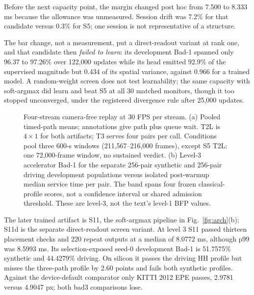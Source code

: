 \documentclass[sigconf,review,anonymous]{acmart}
\newlength{\MMSysPanelWidth}
\newlength{\MMSysPanelMaxWidth}
\newcommand{\MMSysRenderPanel}[1]{%
  \ifdim\MMSysPanelMaxWidth>\MMSysPanelWidth
    \resizebox{\MMSysPanelWidth}{!}{%
      \makebox[\MMSysPanelMaxWidth][c]{\usebox{#1}}}%
  \else
    \makebox[\MMSysPanelWidth][c]{\usebox{#1}}%
  \fi
}
\newcommand{\MMSysPairedFigures}[2]{%
  \begingroup
  \sbox{\MMSysPanelABox}{#1}%
  \sbox{\MMSysPanelBBox}{#2}%
  \setlength{\MMSysPanelWidth}{0.485\textwidth}%
  \setlength{\MMSysPanelMaxWidth}{\wd\MMSysPanelABox}%
  \ifdim\wd\MMSysPanelBBox>\MMSysPanelMaxWidth
    \setlength{\MMSysPanelMaxWidth}{\wd\MMSysPanelBBox}%
  \fi
  \begin{minipage}[t]{\MMSysPanelWidth}\vspace{0pt}\centering
    \MMSysRenderPanel{\MMSysPanelABox}%
  \end{minipage}\hfill
  \begin{minipage}[t]{\MMSysPanelWidth}\vspace{0pt}\centering
    \MMSysRenderPanel{\MMSysPanelBBox}%
  \end{minipage}%
  \endgroup
}
\begin{document}
Before the next capacity point, the margin changed post hoc from 7.500 to 8.333 ms because the allowance was unmeasured. Session drift was 7.2\% for that candidate versus 0.3\% for S5; one session is not representative of a structure.

The bar change, not a measurement, put a direct-readout variant at rank one, and that candidate then \emph{failed to learn}: its development Bad-1 spanned only 96.37 to 97.26\% over 122,000 updates while its head emitted 92.9\% of the supervised magnitude but 0.434 of its spatial variance, against 0.966 for a trained model. A random-weight screen does not test learnability; the same capacity with soft-argmax did learn and beat S5 at all 30 matched monitors, though it too stopped unconverged, under the registered divergence rule after 25,000 updates.

\begin{figure}[t]
\centering
\MMSysPairedFigures{}{}
\caption{Four-stream camera-free replay at 30 FPS per stream. (a) Pooled timed-path means; annotations give path plus queue wait. T2L is $4\times1$ for both artifacts; T3 serves four pairs per call. Conditions pool three 600-s windows (211,567--216,000 frames), except S5 T2L: one 72,000-frame window, no sustained verdict. (b) Level-3 accelerator Bad-1 for the separate 256-pair synthetic and 256-pair driving development populations versus isolated post-warmup median service time per pair. The band spans four frozen classical-profile scores, not a confidence interval or shared admission threshold. These are level-3, not the text's level-1 BFP values.}
\label{fig:path}
\end{figure}

The later trained artifact is S11, the soft-argmax pipeline in Fig.~\ref{fig:arch}(b); S11d is the separate direct-readout screen variant. At level 3 S11 passed thirteen placement checks and 220 repeat outputs at a median of 8.0772 ms, although p99 was 8.5993 ms. Its selection-exposed seed-0 development Bad-1 is 51.7575\% synthetic and 44.4279\% driving. On silicon it passes the driving HH profile but misses the three-path profile by 2.60 points and fails both synthetic profiles. Against the device-default comparator only KITTI 2012 EPE passes, 2.9781 versus 4.9047 px; both bad3 comparisons lose.
\end{document}

